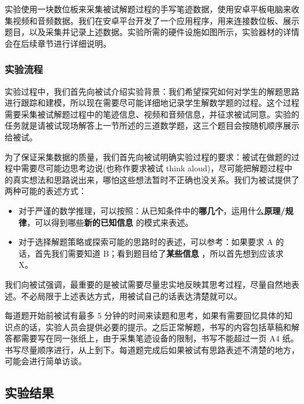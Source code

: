 实验使用一块数位板来采集被试解题过程的手写笔迹数据，使用安卓平板电脑来收集视频和音频数据。我们在安卓平台开发了一个应用程序，用来连接数位板、展示题目，以及采集并记录上述数据。实验所需的硬件设施如图所示，实验器材的详情会在后续章节进行详细说明。


\subsubsection{实验流程}

实验过程中，我们首先向被试介绍实验背景：我们希望探究如何对学生的解题思路进行跟踪和建模，所以现在需要尽可能详细地记录学生解数学题的过程。这个过程需要采集被试解题过程中的笔迹信息、视频和音频信息，并征求被试同意。实验的任务就是请被试现场解答上一节所述的三道数学题，这三个题目会按随机顺序展示给被试。

为了保证采集数据的质量，我们首先向被试明确实验过程的要求：被试在做题的过程中需要尽可能边思考边说(也称作要求被试 think aloud)，尽可能把解题过程中的真实想法和思路说出来，哪怕这些想法暂时不正确也没关系。我们为被试提供了两种可能的表述方式：

\begin{itemize}
    \item 对于严谨的数学推理，可以按照：从已知条件中的\textbf{哪几个}，运用什么\textbf{原理/规律}，可以得到哪些\textbf{新的已知信息} 的模式来表述。
    \item 对于选择解题策略或探索可能的思路时的表述，可以参考：如果要求 A 的话，首先我们需要知道 B；看到题目给了\textbf{某些信息} ，所以首先想到应该求 X。
\end{itemize}

我们向被试强调，最重要的是被试需要尽量忠实地反映其思考过程，尽量自然地表述。不必局限于上述表达方式，用被试自己的话表达清楚就可以。

每道题开始前被试有最多 5 分钟的时间来读题和思考，如果有需要回忆具体的知识点的话，实验人员会提供必要的提示。之后正常解题，书写的内容包括草稿和解答都需要写在同一张纸上，由于采集笔迹设备的限制，书写不能超过一页 A4 纸。书写尽量顺序进行，从上到下。每道题完成后如果被试有思路表述不清楚的地方，可能会进行简单访谈。

\subsection{实验结果}

